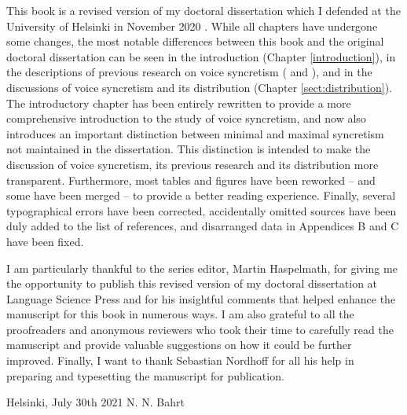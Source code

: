 \addchap{\lsPrefaceTitle}
This book is a revised version of my doctoral dissertation which I defended at the University of Helsinki in November 2020 \citep{bahrt:2020}. While all chapters have undergone some changes, the most notable differences between this book and the original doctoral dissertation can be seen in the introduction (Chapter \ref{introduction}), in the descriptions of previous research on voice syncretism ( and ), and in the discussions of voice syncretism and its distribution (Chapter \ref{sect:distribution}). The introductory chapter has been entirely rewritten to provide a more comprehensive introduction to the study of voice syncretism, and now also introduces an important distinction between minimal and maximal syncretism not maintained in the dissertation. This distinction is intended to make the discussion of voice syncretism, its previous research and its distribution more transparent. Furthermore, most tables and figures have been reworked -- and some have been merged -- to provide a better reading experience. Finally, several typographical errors have been corrected, accidentally omitted sources have been duly added to the list of references, and disarranged data in Appendices B and C have been fixed.

I am particularly thankful to the series editor, Martin Haspelmath, for giving me the opportunity to publish this revised version of my doctoral dissertation at Language Science Press and for his insightful comments that helped enhance the manuscript for this book in numerous ways. I am also grateful to all the proofreaders and anonymous reviewers who took their time to carefully read the manuscript and provide valuable suggestions on how it could be further improved. Finally, I want to thank Sebastian Nordhoff for all his help in preparing and typesetting the manuscript for publication.

\bigskip

\noindent Helsinki, July 30th 2021 \hfill N. N. Bahrt
